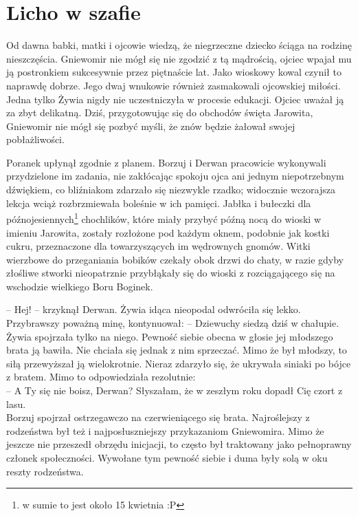 \documentclass[12pt]{book}
\begin{document}
\chapter{Licho w szafie}
Od dawna babki, matki i ojcowie wiedzą, że niegrzeczne dziecko ściąga na rodzinę nieszczęścia. Gniewomir nie mógł się nie zgodzić z tą mądrością, ojciec wpajał mu ją postronkiem sukcesywnie przez piętnaście lat. Jako wioskowy kowal czynił to naprawdę dobrze. Jego dwaj wnukowie również zasmakowali ojcowskiej miłości. Jedna tylko Żywia nigdy nie uczestniczyła w procesie edukacji. Ojciec uważał ją za zbyt delikatną. Dziś, przygotowując się do obchodów święta Jarowita, Gniewomir nie mógł się pozbyć myśli, że znów będzie żałował swojej pobłażliwości. \par
Poranek upłynął zgodnie z planem. Borzuj i Derwan pracowicie wykonywali przydzielone im zadania, nie zakłócając spokoju ojca ani jednym niepotrzebnym dźwiękiem, co bliźniakom zdarzało się niezwykle rzadko; widocznie wczorajsza lekcja wciąż rozbrzmiewała boleśnie w ich pamięci. Jabłka i bułeczki dla późnojesiennych\footnote{w sumie to jest około 15 kwietnia :P} chochlików, które miały przybyć późną nocą do wioski w imieniu Jarowita, zostały rozłożone pod każdym oknem, podobnie jak kostki cukru, przeznaczone dla towarzyszących im wędrownych gnomów. Witki wierzbowe do przeganiania bobików czekały obok drzwi do chaty, w razie gdyby złośliwe stworki nieopatrznie przybłąkały się do wioski z rozciągającego się na wschodzie wielkiego Boru Boginek. \par
-- Hej! -- krzyknął Derwan. Żywia idąca nieopodal odwróciła się lekko. Przybrawszy poważną minę, kontynuował: -- Dziewuchy siedzą dziś w chałupie.\\
Żywia spojrzała tylko na niego. Pewność siebie obecna w głosie jej młodszego brata ją bawiła. Nie chciała się jednak z nim sprzeczać. Mimo że był młodszy, to siłą przewyższał ją wielokrotnie. Nieraz zdarzyło się, że ukrywała siniaki po bójce z bratem. Mimo to odpowiedziała rezolutnie:\\
\indent -- A Ty się nie boisz, Derwan? Słyszałam, że w zeszłym roku dopadł Cię czort z lasu. \\ 
Borzuj spojrzał ostrzegawczo na czerwieniącego się brata. Najroślejszy z rodzeństwa był też i najposłuszniejszy przykazaniom Gniewomira. Mimo że jeszcze nie przeszedł obrzędu inicjacji, to często był traktowany jako pełnoprawny członek społeczności. Wywołane tym pewność siebie i duma były solą w oku reszty rodzeństwa.\par
\end{document}
